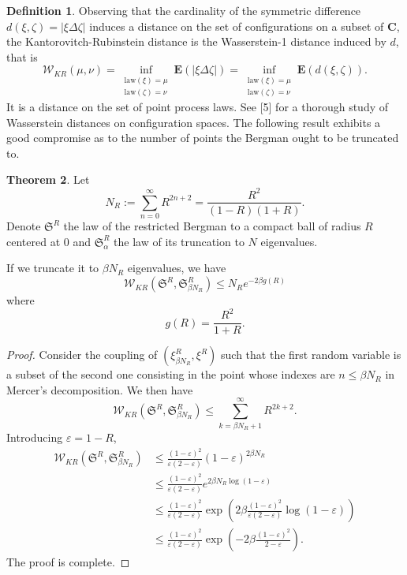 \documentclass[11pt]{article}
\theoremstyle{plain}
\theoremstyle{definition}
\newtheorem{definition}{Definition}
\newtheorem{theorem}[definition]{Theorem}
\begin{document}
\begin{definition} Observing that the cardinality of the symmetric difference $d(\xi, \zeta) = |\xi \Delta \zeta|$ induces a distance on the set of configurations on a subset of $\mathbf{C}$, the Kantorovitch-Rubinstein distance is the Wasserstein-1 distance induced by $d$, that is
\[
\mathcal{W}_{KR}(\mu, \nu) = \inf_{\substack{\text{law}(\xi)=\mu \\ \text{law}(\zeta)=\nu}} \mathbf{E}(|\xi \Delta \zeta|) = \inf_{\substack{\text{law}(\xi)=\mu \\ \text{law}(\zeta)=\nu}} \mathbf{E}(d(\xi, \zeta)).
\]
It is a distance on the set of point process laws. See [5] for a thorough study of Wasserstein distances on configuration spaces. The following result exhibits a good compromise as to the number of points the Bergman ought to be truncated to.
\end{definition}

\begin{theorem} \label{thm:main-analog}
Let
\[
N_R := \sum_{n=0}^\infty R^{2n+2} = \frac{R^2}{(1-R)(1+R)}.
\]
Denote $\mathfrak{S}^R$ the law of the restricted Bergman to a compact ball of radius $R$ centered at 0 and $\mathfrak{S}_\alpha^R$ the law of its truncation to $N$ eigenvalues.

If we truncate it to $\beta N_R$ eigenvalues, we have
\begin{equation}
\mathcal{W}_{KR}(\mathfrak{S}^R, \mathfrak{S}_{\beta N_R}^R) \leqslant N_R e^{-2\beta g(R)}
\end{equation}
where
\[
g(R) = \frac{R^2}{1+R}.
\]
\end{theorem}

\begin{proof}

Consider the coupling of $(\xi_{\beta N_R}^R, \xi^R)$ such that the first random variable is a subset of the second one consisting in the point whose indexes are $n \le \beta N_R$ in Mercer's decomposition. We then have
\[
\mathcal{W}_{KR}(\mathfrak{S}^R, \mathfrak{S}_{\beta N_R}^R) \leqslant \sum_{k=\beta N_R+1}^\infty R^{2k+2}.
\]
Introducing $\varepsilon = 1 - R$,
\begin{align*}
\mathcal{W}_{KR}(\mathfrak{S}^R, \mathfrak{S}_{\beta N_R}^R) &\leqslant \frac{(1-\varepsilon)^2}{\varepsilon(2-\varepsilon)} (1-\varepsilon)^{2\beta N_R} \\
&\leqslant \frac{(1-\varepsilon)^2}{\varepsilon(2-\varepsilon)} e^{2\beta N_R \log(1-\varepsilon)} \\
&\leqslant \frac{(1-\varepsilon)^2}{\varepsilon(2-\varepsilon)} \exp \left( 2\beta \frac{(1-\varepsilon)^2}{\varepsilon(2-\varepsilon)} \log(1-\varepsilon) \right) \\
&\leqslant \frac{(1-\varepsilon)^2}{\varepsilon(2-\varepsilon)} \exp \left( -2\beta \frac{(1-\varepsilon)^2}{2-\varepsilon} \right).
\end{align*}
The proof is complete.
\end{proof}
\end{document}
